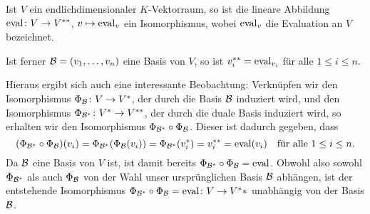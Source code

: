 \documentclass[a4paper,10pt]{article}
\begin{document}
\begin{shaded}
 Ist $V$ ein endlichdimensionaler $K$-Vektorraum, so ist die lineare Abbildung \mbox{$\mathrm{eval} \colon V \to V^{**}$}, $v \mapsto \mathrm{eval}_v$ ein Isomorphismus, wobei $\mathrm{eval}_v$ die Evaluation an $V$ bezeichnet.
 
 Ist ferner $\mathcal{B} = (v_1, \dotsc, v_n)$ eine Basis von $V$, so ist $v_i^{**} = \mathrm{eval}_{v_i}$ für alle $1 \leq i \leq n$.
\end{shaded}

Hieraus ergibt sich auch eine interessante Beobachtung: Verknüpfen wir den Isomorphismus $\Phi_{\mathcal{B}} \colon V \to V^*$, der durch die Basis $\mathcal{B}$ induziert wird, und den Isomorphismus $\Phi_{\mathcal{B}^*} \colon V^* \to V^{**}$, der durch die duale Basis induziert wird, so erhalten wir den Isomorphismus $\Phi_{\mathcal{B}^*} \circ \Phi_{\mathcal{B}}$. Dieser ist dadurch gegeben, dass 
\[
 (\Phi_{\mathcal{B}^*} \circ \Phi_{\mathcal{B}})(v_i)
 = \Phi_{\mathcal{B}^*}(\Phi_{\mathcal{B}}(v_i))
 = \Phi_{\mathcal{B}^*}(v_i^*)
 = v_i^{**}
 = \mathrm{eval}(v_i)
 \quad
 \text{für alle $1 \leq i \leq n$}.
\]
Da $\mathcal{B}$ eine Basis von $V$ ist, ist damit bereits $\Phi_{\mathcal{B}^*} \circ \Phi_{\mathcal{B}} = \mathrm{eval}$. Obwohl also sowohl $\Phi_{\mathcal{B}^*}$ als auch $\Phi_{\mathcal{B}}$ von der Wahl unser ursprünglichen Basis $\mathcal{B}$ abhängen, ist der entstehende Isomorphismus $\Phi_{\mathcal{B}^*} \circ \Phi_{\mathcal{B}} = \mathrm{eval} \colon V \to V^**$ unabhängig von der Basis $\mathcal{B}$.
\end{document}
